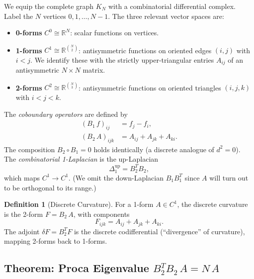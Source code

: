 \documentclass[aip,jmp,reprint,superscriptaddress,floatfix,nofootinbib]{revtex4-2}
\theoremstyle{definition}
\newtheorem{definition}[theorem]{Definition}
\theoremstyle{remark}
\begin{document}
We equip the complete graph $K_N$ with a combinatorial differential
complex.  Label the $N$ vertices $0, 1, \ldots, N{-}1$.  The three
relevant vector spaces are:
\begin{itemize}
\item \textbf{0-forms} $C^0 \cong \mathbb{R}^N$: scalar functions on
  vertices.
\item \textbf{1-forms} $C^1 \cong \mathbb{R}^{\binom{N}{2}}$:
  antisymmetric functions on oriented edges $(i,j)$ with $i < j$.
  We identify these with the strictly upper-triangular entries
  $A_{ij}$ of an antisymmetric $N \times N$ matrix.
\item \textbf{2-forms} $C^2 \cong \mathbb{R}^{\binom{N}{3}}$:
  antisymmetric functions on oriented triangles $(i,j,k)$ with
  $i < j < k$.
\end{itemize}
The \emph{coboundary operators} are defined by
\begin{align}
(B_1\, f)_{ij} &= f_j - f_i, \label{eq:B1}\\
(B_2\, A)_{ijk} &= A_{ij} + A_{jk} + A_{ki}. \label{eq:B2}
\end{align}
The composition $B_2 \circ B_1 = 0$ holds identically (a discrete
analogue of $d^2 = 0$).  The \emph{combinatorial 1-Laplacian} is the
up-Laplacian
\begin{equation}\label{eq:laplacian}
\Delta_1^{\mathrm{up}} = B_2^T B_2,
\end{equation}
which maps $C^1 \to C^1$.  (We omit the down-Laplacian $B_1 B_1^T$
since $A$ will turn out to be orthogonal to its range.)

\begin{definition}[Discrete Curvature]\label{def:curvature}
For a 1-form $A \in C^1$, the discrete curvature is the 2-form
$F = B_2\, A$, with components
\begin{equation}\label{eq:F-def}
F_{ijk} = A_{ij} + A_{jk} + A_{ki}.
\end{equation}
The adjoint $\delta F = B_2^T F$ is the discrete codifferential
(``divergence'' of curvature), mapping 2-forms back to 1-forms.
\end{definition}

\subsection{Theorem: Proca Eigenvalue \texorpdfstring{$B_2^T B_2\, A = N\, A$}{B2\^{}T B2 A = N A}}
\label{sec:proca:eigenvalue}
\end{document}
